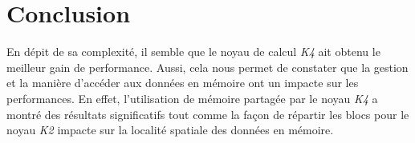 \documentclass[11pt, twocolumn]{article}
\begin{document}
\section{Conclusion}
\label{section:conclusion}
En dépit de sa complexité, il semble que le noyau de 
calcul \textit{K4} ait obtenu le meilleur gain de performance.
Aussi, cela nous permet de constater que la gestion et la
manière d'accéder aux données en mémoire ont un impacte sur
les performances. En effet, l'utilisation de mémoire partagée par 
le noyau \textit{K4} a montré des résultats significatifs 
tout comme la façon de répartir les blocs pour le noyau \textit{K2}
impacte sur la localité spatiale des données en mémoire.
\end{document}
